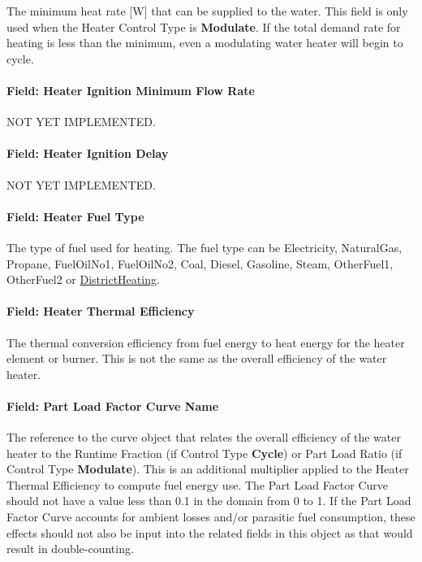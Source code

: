 The minimum heat rate {[}W{]} that can be supplied to the water. This field is only used when the Heater Control Type is \textbf{Modulate}. If the total demand rate for heating is less than the minimum, even a modulating water heater will begin to cycle.

\paragraph{Field: Heater Ignition Minimum Flow Rate}\label{field-heater-ignition-minimum-flow-rate}

NOT YET IMPLEMENTED.

\paragraph{Field: Heater Ignition Delay}\label{field-heater-ignition-delay}

NOT YET IMPLEMENTED.

\paragraph{Field: Heater Fuel Type}\label{field-heater-fuel-type}

The type of fuel used for heating. The fuel type can be Electricity, NaturalGas, Propane, FuelOilNo1, FuelOilNo2, Coal, Diesel, Gasoline, Steam, OtherFuel1, OtherFuel2 or \hyperref[districtheating]{DistrictHeating}.

\paragraph{Field: Heater Thermal Efficiency}\label{field-heater-thermal-efficiency}

The thermal conversion efficiency from fuel energy to heat energy for the heater element or burner. This is not the same as the overall efficiency of the water heater.

\paragraph{Field: Part Load Factor Curve Name}\label{field-part-load-factor-curve-name}

The reference to the curve object that relates the overall efficiency of the water heater to the Runtime Fraction (if Control Type \textbf{Cycle}) or Part Load Ratio (if Control Type \textbf{Modulate}). This is an additional multiplier applied to the Heater Thermal Efficiency to compute fuel energy use. The Part Load Factor Curve should not have a value less than 0.1 in the domain from 0 to 1. If the Part Load Factor Curve accounts for ambient losses and/or parasitic fuel consumption, these effects should not also be input into the related fields in this object as that would result in double-counting.

